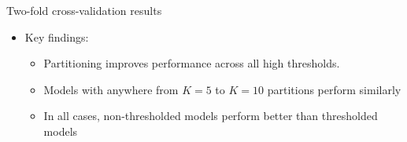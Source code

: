 \documentclass{beamer}
\begin{document}
\begin{frame}{Two-fold cross-validation results}
  \begin{itemize} \setlength{\itemsep}{0.5em}
    \item Key findings:
    \begin{itemize}
      \item Partitioning improves performance across all high thresholds.
      \item Models with anywhere from $K = 5$ to $K = 10$ partitions perform similarly
      \item In all cases, non-thresholded models perform better than thresholded models
    \end{itemize}
  \end{itemize}
\end{frame}




\end{document}
